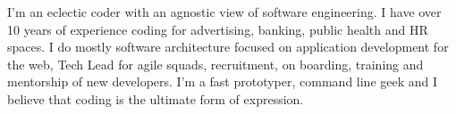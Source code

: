 %
%
%
\par{
I'm an eclectic coder with an agnostic view of software engineering. I have over 10 years of experience coding for advertising, banking, public health and HR spaces. I do mostly software architecture focused on application development for the web, Tech Lead for agile squads, recruitment, on boarding, training and mentorship of new developers. 
I'm a fast prototyper, command line geek and I believe that coding is the ultimate form of expression.

}